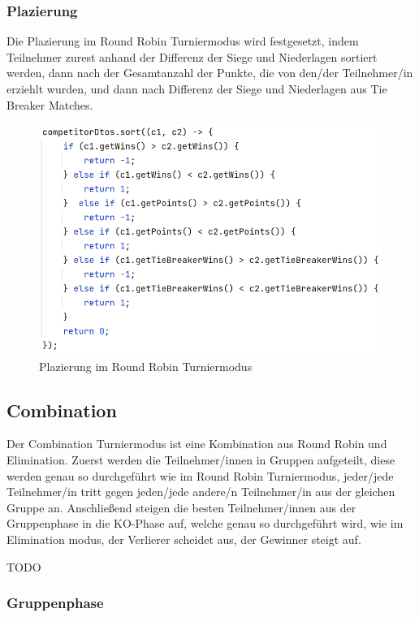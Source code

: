 \subsubsection{Plazierung}

Die Plazierung im Round Robin Turniermodus wird festgesetzt, indem Teilnehmer zurest anhand der Differenz der Siege und Niederlagen sortiert werden, dann nach 
der Gesamtanzahl der Punkte, die von den/der Teilnehmer/in erziehlt wurden, und dann nach Differenz der Siege und Niederlagen aus Tie Breaker Matches.

\begin{figure}[H]
    \includegraphics[scale=0.6]{pics/backend/roundrobin/roundrobin_rankCompetitors.png}
    \caption{Plazierung im Round Robin Turniermodus}
\end{figure}

\subsection{Combination}

Der Combination Turniermodus ist eine Kombination aus Round Robin und Elimination. Zuerst werden die Teilnehmer/innen in Gruppen aufgeteilt, diese werden genau so durchgeführt wie im Round Robin Turniermodus, 
jeder/jede Teilnehmer/in tritt gegen jeden/jede andere/n Teilnehmer/in aus der gleichen Gruppe an. Anschließend steigen die besten Teilnehmer/innen aus der Gruppenphase in die KO-Phase auf, welche genau  so 
durchgeführt wird, wie im Elimination modus, der Verlierer scheidet aus, der Gewinner steigt auf.

TODO

\subsubsection{Gruppenphase}

